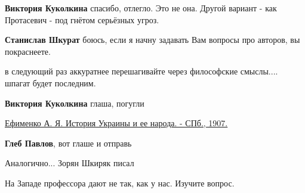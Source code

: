 \begin{itemize}
\begin{itemize}
\textbf{Виктория Куколкина} спасибо, отлегло.
Это не она.
Другой вариант - как Протасевич - под гнётом серьёзных угроз.


 
\textbf{Станислав Шкурат} боюсь, если я начну задавать Вам вопросы про авторов, вы покраснеете.

 
в следующий раз аккуратнее перешагивайте через философские смыслы.... шпагат будет последним.

 
\textbf{Виктория Куколкина} \Smiley[1.0][yellow] глаша, погугли

\href{http://elib.shpl.ru/ru/nodes/14445-efimenko-a-ya-istoriya-ukrainy-i-ee-naroda-spb-1907}{%
Ефименко А. Я. История Украины и ее народа. - СПб., 1907.}

 
\textbf{Глеб Павлов}, вот глаше и отправь

 
Аналогично... Зорян Шкиряк писал

 
На Западе профессора дают не так, как у нас. Изучите вопрос.


\end{itemize}
\end{itemize}
